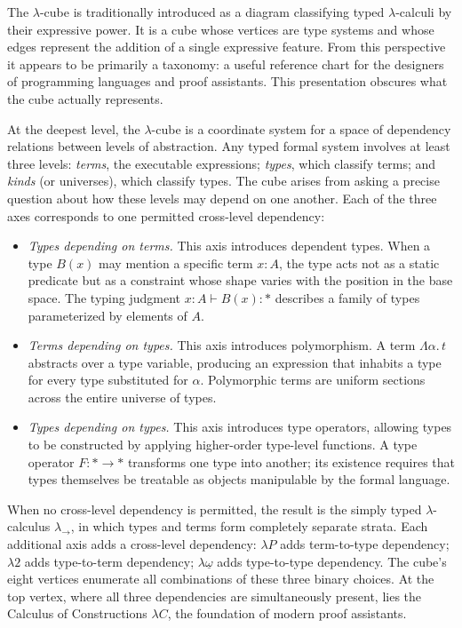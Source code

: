 \documentclass[12pt,a4paper]{article}
\theoremstyle{plain}
\theoremstyle{definition}
\begin{document}
The $\lambda$-cube is traditionally introduced as a diagram classifying typed $\lambda$-calculi by their expressive power. It is a cube whose vertices are type systems and whose edges represent the addition of a single expressive feature. From this perspective it appears to be primarily a taxonomy: a useful reference chart for the designers of programming languages and proof assistants. This presentation obscures what the cube actually represents.

At the deepest level, the $\lambda$-cube is a coordinate system for a space of dependency relations between levels of abstraction. Any typed formal system involves at least three levels: \emph{terms}, the executable expressions; \emph{types}, which classify terms; and \emph{kinds} (or universes), which classify types. The cube arises from asking a precise question about how these levels may depend on one another. Each of the three axes corresponds to one permitted cross-level dependency:

\begin{itemize}[leftmargin=2em]
\item \emph{Types depending on terms.} This axis introduces dependent types. When a type $B(x)$ may mention a specific term $x : A$, the type acts not as a static predicate but as a constraint whose shape varies with the position in the base space. The typing judgment $x : A \vdash B(x) : *$ describes a family of types parameterized by elements of $A$.

\item \emph{Terms depending on types.} This axis introduces polymorphism. A term $\Lambda\alpha.\, t$ abstracts over a type variable, producing an expression that inhabits a type for every type substituted for $\alpha$. Polymorphic terms are uniform sections across the entire universe of types.

\item \emph{Types depending on types.} This axis introduces type operators, allowing types to be constructed by applying higher-order type-level functions. A type operator $F : * \to *$ transforms one type into another; its existence requires that types themselves be treatable as objects manipulable by the formal language.
\end{itemize}

When no cross-level dependency is permitted, the result is the simply typed $\lambda$-calculus $\lambda_\to$, in which types and terms form completely separate strata. Each additional axis adds a cross-level dependency: $\lambda P$ adds term-to-type dependency; $\lambda 2$ adds type-to-term dependency; $\lambda\underline\omega$ adds type-to-type dependency. The cube's eight vertices enumerate all combinations of these three binary choices. At the top vertex, where all three dependencies are simultaneously present, lies the Calculus of Constructions $\lambda C$, the foundation of modern proof assistants.
\end{document}
